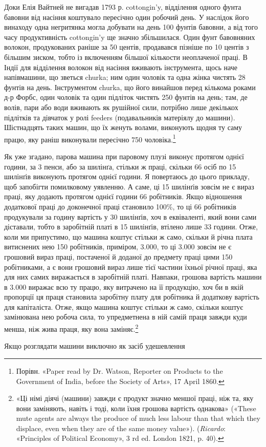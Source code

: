 \parcont{}  %
Доки Елія Вайтней не вигадав 1793 р. cottongin’y, відділення одного
фунта бавовни від насіння коштувало пересічно один робочий
день. У наслідок його винаходу одна негритянка могла добувати
на день 100 фунтів бавовни, а від того часу продуктивність cottongin’y
ще значно збільшилася. Один фунт бавовняних волокон,
продукованих раніше за 50 центів, продавався пізніше по
10 центів з більшим зиском, тобто із включенням більшої кількости
неоплаченої праці. В Індії для відділення волокон від насіння
вживають інструмента, щось наче напівмашини, що зветься
churka; ним один чоловік та одна жінка чистять 28 фунтів на день.
Інструментом churka, що його винайшов перед кількома роками д-р Форбс, один
чоловік та один підліток чистять 250 фунтів на
день; там, де волів, пари або води вживають як рушійної сили,
потрібно лише декількох підлітків та дівчаток у ролі feeders
(подавальників матеріялу до машини). Шістнадцять таких машин,
що їх женуть волами, виконують щодня ту саму працю, яку раніш
виконували пересічно 750 чоловіка.\footnote{
Порівн. «Paper read by Dr. Watson, Reporter on Products to the
Government of India, before the Society of Arts», 17 April 1860.
}

Як уже згадано, парова машина при паровому плузі виконує
протягом однієї години, за 3 пенси, або за  шилінґа, стільки ж
праці, скільки 66 осіб по 15 шилінґів виконують протягом однієї
години. Я повертаюсь до цього прикладу, щоб запобігти помилковому
уявленню. А саме, ці 15 шилінґів зовсім не є вираз праці, яку
додають протягом однієї години 66 робітників. Якщо відношення
додаткової праці до доконечної праці становило 100\%, то ці
66 робітників продукували за годину вартість у 30 шилінґів,
хоч в еквіваленті, який вони сами діставали, тобто в заробітній
платі в 15 шилінґів, втілено лише 33 години. Отже, коли ми припустимо,
що машина коштує стільки ж само, скільки й річна
плата витиснених нею 150 робітників, приміром, 3.000, то ці 3.000 зовсім не є грошовий
вираз праці, постаченої й доданої до предмету праці цими 150 робітниками,
а є вони грошовий вираз лише тієї частини їхньої
річної праці, яка для них самих виражається в заробітній платі.
Навпаки, грошова вартість машини в 3.000
виражає всю ту працю, яку витрачено на її продукцію, хоч би
в якій пропорції ця праця становила заробітну плату для
робітника й додаткову вартість для капіталіста. Отже, якщо
машина коштує стільки ж само, скільки коштує замінювана нею
робоча сила, то упредметнена в ній самій праця завжди куди
менша, ніж жива праця, яку вона заміняє.\footnote{
«Ці німі діячі (машини) завжди є продукт значно меншої праці,
ніж та, яку вони заміняють, навіть і тоді, коли їхня грошова вартість
однакова» («These mute agents are always the produce of much less labour
than that which they displace, even when they are of the same money
value»). (\emph{Ricardo}: «Principles of Political Economy», 3 rd ed. London
1821, p. 40).
}

Якщо розглядати машини виключно як засіб удешевлення
\parbreak{}  %
